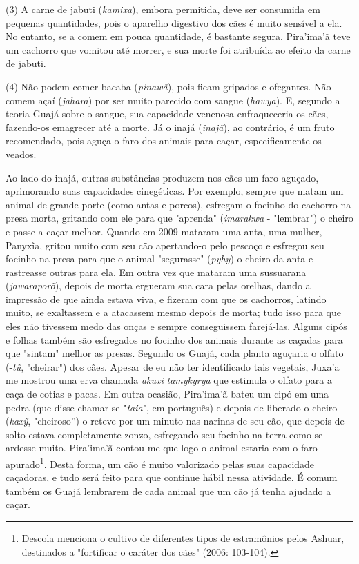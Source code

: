 (3) A carne de jabuti (\emph{kamixa}), embora permitida, deve ser
consumida em pequenas quantidades, pois o aparelho digestivo dos cães é
muito sensível a ela. No entanto, se a comem em pouca quantidade, é
bastante segura. Pira'ima'ã teve um cachorro que vomitou até morrer, e
sua morte foi atribuída ao efeito da carne de jabuti.

(4) Não podem comer bacaba (\emph{pinawã}), pois ficam gripados e
ofegantes. Não comem açaí (\emph{jahara}) por ser muito parecido com
sangue (\emph{hawya}). E, segundo a teoria Guajá sobre o sangue, sua
capacidade venenosa enfraqueceria os cães, fazendo-os emagrecer até a
morte. Já o inajá (\emph{inajã}), ao contrário, é um fruto recomendado,
pois aguça o faro dos animais para caçar, especificamente os veados.

Ao lado do inajá, outras substâncias produzem nos cães um faro aguçado,
aprimorando suas capacidades cinegéticas. Por exemplo, sempre que matam
um animal de grande porte (como antas e porcos), esfregam o focinho do
cachorro na presa morta, gritando com ele para que "aprenda"
(\emph{imarakwa} - "lembrar") o cheiro e passe a caçar melhor. Quando em
2009 mataram uma anta, uma mulher, Panyxĩa, gritou muito com seu cão
apertando-o pelo pescoço e esfregou seu focinho na presa para que o
animal "segurasse" (\emph{pyhy}) o cheiro da anta e rastreasse outras
para ela. Em outra vez que mataram uma sussuarana (\emph{jawaraporõ}),
depois de morta ergueram sua cara pelas orelhas, dando a impressão de
que ainda estava viva, e fizeram com que os cachorros, latindo muito, se
exaltassem e a atacassem mesmo depois de morta; tudo isso para que eles
não tivessem medo das onças e sempre conseguissem farejá-las. Alguns
cipós e folhas também são esfregados no focinho dos animais durante as
caçadas para que "sintam" melhor as presas. Segundo os Guajá, cada
planta aguçaria o olfato (-\emph{tũ}, "cheirar") dos cães. Apesar de eu
não ter identificado tais vegetais, Juxa'a me mostrou uma erva chamada
\emph{akuxi} \emph{tamykyrya} que estimula o olfato para a caça de
cotias e pacas. Em outra ocasião, Pira'ima'ã bateu um cipó em uma pedra
(que disse chamar-se "\emph{taia}", em português) e depois de liberado o
cheiro (\emph{kaxỹ}, "cheiroso'') o reteve por um minuto nas narinas de
seu cão, que depois de solto estava completamente zonzo, esfregando seu
focinho na terra como se ardesse muito. Pira'ima'ã contou-me que logo o
animal estaria com o faro apurado\footnote{Descola menciona o cultivo de
  diferentes tipos de estramônios pelos Ashuar, destinados a "fortificar
  o caráter dos cães" (2006: 103-104).}. Desta forma, um cão é muito
valorizado pelas suas capacidade caçadoras, e tudo será feito para que
continue hábil nessa atividade. É comum também os Guajá lembrarem de
cada animal que um cão já tenha ajudado a caçar.

